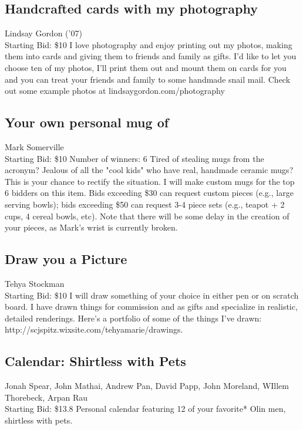 \documentclass[11pt]{article}
\begin{document}
\subsection{Handcrafted cards with my photography}
Lindsay Gordon ('07)
\\
Starting Bid: \$10
\newline
I love photography and enjoy printing out my photos, making them into cards and giving them to friends and family as gifts. I’d like to let you choose ten of my photos, I’ll print them out and mount them on cards for you and you can treat your friends and family to some handmade snail mail. Check out some example photos at lindsaygordon.com/photography
\subsection{Your own personal mug of}
Mark Somerville
\\
Starting Bid: \$10
\newline
Number of winners: 6
\newline
Tired of stealing mugs from the acronym? Jealous of all the "cool kids" who have real, handmade ceramic mugs?  This is your chance to rectify the situation. I will make custom mugs for the top 6 bidders on this item.  Bids exceeding \$30 can request custom pieces (e.g., large serving bowls); bids exceeding \$50 can request 3-4 piece sets (e.g., teapot + 2 cups, 4 cereal bowls, etc).  Note that there will be some delay in the creation of your pieces, as Mark's wrist is currently broken.
\subsection{Draw you a Picture}
Tehya Stockman
\\
Starting Bid: \$10
\newline
I will draw something of your choice in either pen or on scratch board. I have drawn things for commission and as gifts  and specialize in realistic, detailed renderings. Here's a portfolio of some of the things I've drawn: http://scjspitz.wixsite.com/tehyamarie/drawings.
\subsection{Calendar: Shirtless with Pets}
Jonah Spear, John Mathai, Andrew Pan, David Papp, John Moreland, WIllem Thorebeck, Arpan Rau
\\
Starting Bid: \$13.8
\newline
Personal calendar featuring 12 of your favorite* Olin men, shirtless with pets.
\end{document}

